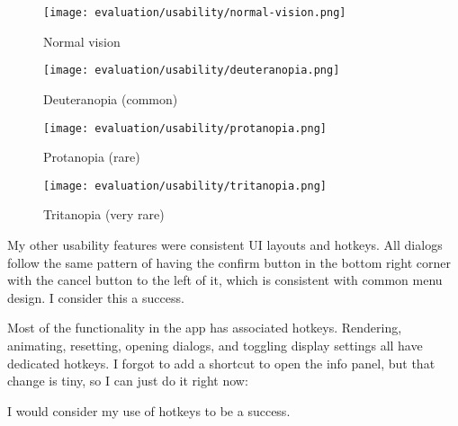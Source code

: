 \documentclass[../main.tex]{subfiles}
\begin{document}
\begin{figure}[H]
	\begin{minipage}{0.48\linewidth}
		\centering
		\texttt{[image: evaluation/usability/normal-vision.png]}
		\caption{Normal vision}
		\label{fig:evaluation:usability:normal-vision.png}
	\end{minipage}\hfill
	\begin{minipage}{0.48\linewidth}
		\centering
		\texttt{[image: evaluation/usability/deuteranopia.png]}
		\caption{Deuteranopia (common)}
		\label{fig:evaluation:usability:deuteranopia.png}
	\end{minipage}
\end{figure}
\begin{figure}[H]
	\begin{minipage}{0.48\linewidth}
		\centering
		\texttt{[image: evaluation/usability/protanopia.png]}
		\caption{Protanopia (rare)}
		\label{fig:evaluation:usability:protanopia.png}
	\end{minipage}\hfill
	\begin{minipage}{0.48\linewidth}
		\centering
		\texttt{[image: evaluation/usability/tritanopia.png]}
		\caption{Tritanopia (very rare)}
		\label{fig:evaluation:usability:tritanopia.png}
	\end{minipage}
\end{figure}

My other usability features were consistent UI layouts and hotkeys. All dialogs follow the same pattern of having the confirm button in the bottom right corner with the cancel button to the left of it, which is consistent with common menu design. I consider this a success.

Most of the functionality in the app has associated hotkeys. Rendering, animating, resetting, opening dialogs, and toggling display settings all have dedicated hotkeys. I forgot to add a shortcut to open the info panel, but that change is tiny, so I can just do it right now:


I would consider my use of hotkeys to be a success.
\end{document}
